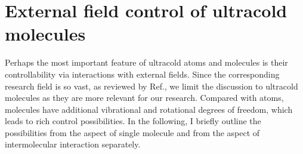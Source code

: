 \section{External field control of ultracold molecules}
\label{sec:control}
Perhaps the most important feature of ultracold atoms and molecules is their controllability via interactions with  
external fields. Since the corresponding research field is so vast, as reviewed by Ref.\cite{lemoshko2013}, 
we  limit the discussion to ultracold molecules as they are more relevant for our research.  
Compared with atoms, molecules have additional vibrational and rotational degrees of freedom, which leads to rich 
control possibilities. In the following, I briefly outline the possibilities from the aspect of single molecule and from
the aspect of intermolecular interaction separately. 

